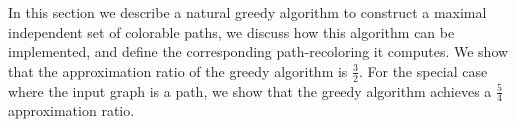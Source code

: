 \label{sec:greedy}

In this section we describe a natural greedy algorithm to construct a maximal
independent set of colorable paths, we discuss how this algorithm can be implemented,
and define the corresponding path-recoloring it computes.
%
We show that the approximation ratio of the greedy algorithm is $\frac{3}{2}$.
%
For the special case where the input graph is a path, 
we show that the greedy algorithm achieves a $\frac{5}{4}$ approximation ratio.




